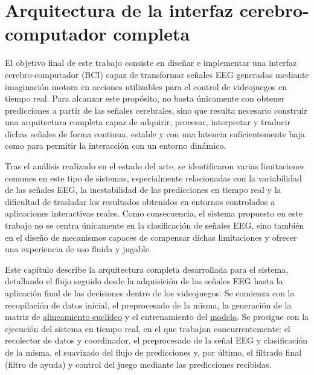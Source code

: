 \chapter{Arquitectura de la interfaz cerebro-computador completa}
\label{cap:arquitecturaPipeline}

El objetivo final de este trabajo consiste en diseñar e implementar una interfaz cerebro-computador (BCI) capaz de transformar señales EEG generadas mediante imaginación motora en acciones utilizables para el control de videojuegos en tiempo real. Para alcanzar este propósito, no basta únicamente con obtener predicciones a partir de las señales cerebrales, sino que resulta necesario construir una arquitectura completa capaz de adquirir, procesar, interpretar y traducir dichas señales de forma continua, estable y con una latencia suficientemente baja como para permitir la interacción con un entorno dinámico.

Tras el análisis realizado en el estado del arte, se identificaron varias limitaciones comunes en este tipo de sistemas, especialmente relacionadas con la variabilidad de las señales EEG, la inestabilidad de las predicciones en tiempo real y la dificultad de trasladar los resultados obtenidos en entornos controlados a aplicaciones interactivas reales. Como consecuencia, el sistema propuesto en este trabajo no se centra únicamente en la clasificación de señales EEG, sino también en el diseño de mecanismos capaces de compensar dichas limitaciones y ofrecer una experiencia de uso fluida y jugable.

Este capítulo describe la arquitectura completa desarrollada para el sistema, detallando el flujo seguido desde la adquisición de las señales EEG hasta la aplicación final de las decisiones dentro de los videojuegos. Se comienza con la recopilación de datos inicial, el preprocesado de la misma, la generación de la matriz de \hyperref[subsec:alineamiento_euclideo]{alineamiento euclídeo} y el entrenamiento del \hyperref[sec:modelo]{modelo}. Se prosigue con la ejecución del sistema en tiempo real, en el que trabajan concurrentemente: el recolector de datos y coordinador, el preprocesado de la señal EEG y clasificación de la misma, el suavizado del flujo de predicciones y, por último, el filtrado final (filtro de ayuda) y control del juego mediante las predicciones recibidas.

